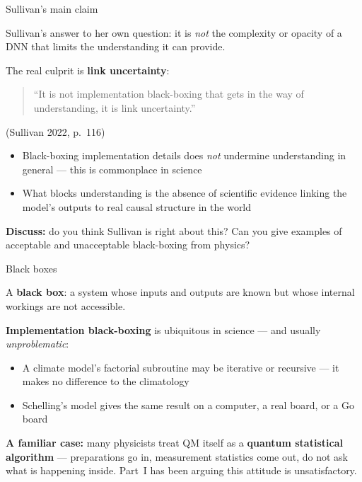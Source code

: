 \documentclass[fleql]{beamer}
\newcommand{\kw}[1]{\textbf{#1}}
\begin{document}
\begin{frame}{Sullivan's main claim}

  Sullivan's answer to her own question: it is \emph{not}
  the complexity or opacity of a DNN that limits the understanding
  it can provide.

  \vspace{0.5em}
  The real culprit is \kw{link uncertainty}:
  \begin{quote}
  ``It is not implementation black-boxing that gets in the way of
  understanding, it is link uncertainty.''
  \end{quote}
  \hfill\small (Sullivan 2022, p.~116)

  \vspace{0.5em}
  \begin{itemize}
  \item Black-boxing implementation details does \emph{not}
    undermine understanding in general --- this is commonplace
    in science
  \item What blocks understanding is the absence of scientific
    evidence linking the model's outputs to real causal structure
    in the world
  \end{itemize}

  \vspace{0.4em}
  \textbf{Discuss:} do you think Sullivan is right about this?
  Can you give examples of acceptable and unacceptable black-boxing
  from physics?

\end{frame}

\begin{frame}{Black boxes}

  A \kw{black box}: a system whose inputs and outputs are known
  but whose internal workings are not accessible.

  \vspace{0.5em}
  \textbf{Implementation black-boxing} is ubiquitous in science
  --- and usually \emph{unproblematic}:
  \begin{itemize}
  \item A climate model's factorial subroutine may be iterative
    or recursive --- it makes no difference to the climatology
  \item Schelling's model gives the same result on a computer,
    a real board, or a Go board
  \end{itemize}

  \vspace{0.5em}
  \textbf{A familiar case:} many physicists treat QM itself as a
  \kw{quantum statistical algorithm} --- preparations go in,
  measurement statistics come out, do not ask what is happening
  inside. Part~I has been arguing this attitude is unsatisfactory.

\end{frame}
\end{document}

